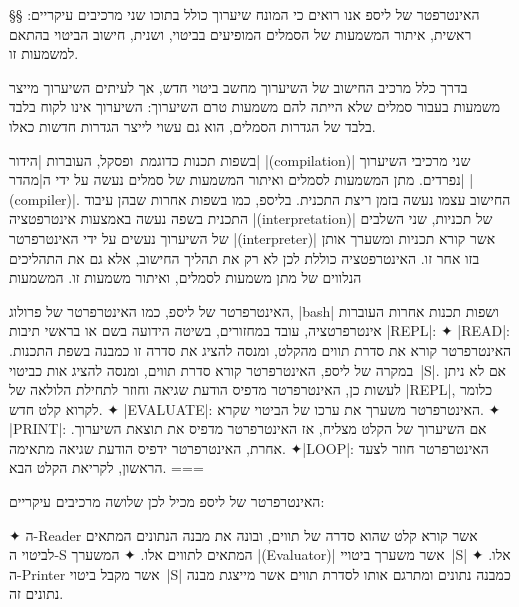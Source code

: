 §§ האינטרפטר של ליספ
אנו רואים כי המונח שיערוך כולל בתוכו שני מרכיבים עיקריים: ראשית, איתור המשמעות
של הסמלים המופיעים בביטוי, ושנית, חישוב הביטוי בהתאם למשמעות זו.

בדרך כלל מרכיב החישוב של השיערוך מחשב ביטוי חדש, אך לעיתים השיערוך מייצר משמעות
בעבור סמלים שלא הייתה להם משמעות טרם השיערוך: השיערוך אינו לקוח בלבד
בלבד של הגדרות הסמלים, הוא גם עשוי לייצר הגדרות חדשות כאלו.

בשפות תכנות כדוגמת~\CPL ופסקל, העוברות \ע|הידור| \E|(compilation)| שני מרכיבי
השיערוך נפרדים. מתן המשמעות לסמלים ואיתור המשמעות של סמלים נעשה על ידי
ה\ע|מהדר| \E|(compiler)|. החישוב עצמו נעשה בזמן ריצת התכנית. בליספ, כמו בשפות
אחרות שבהן עיבוד התכנית בשפה נעשה באמצעות אינטרפטציה \E|(interpretation)| של
תכניות, שני השלבים של השיערוך נעשים על ידי האינטרפרטר \E|(interpreter)| אשר
קורא תכניות ומשערך אותן בזו אחר זו. האינטרפטציה כוללת לכן לא רק את תהליך החישוב,
אלא גם את התהליכים הנלווים של מתן משמעות לסמלים, ואיתור משמעות זו.
המשמעות

\begin{minipage}\linewidth
  \footnotesize
  \begin{mdframed}[backgroundcolor=Lavender!20]
    האינטרפרטר של ליספ, כמו האינטרפרטר של פרולוג, \E|bash| ושפות תכנות אחרות
    העוברות אינטרפרטציה, עובד במחזורים, בשיטה הידועה בשם
    או בראשי תיבות \E|REPL|:
    ✦ \E|READ|: האינטרפרטר קורא את סדרת תווים מהקלט, ומנסה להציג את סדרה זו
    כמבנה בשפת התכנות. במקרה של ליספ, האינטרפרטר קורא סדרת תווים, ומנסה להציג
    אות כביטוי~\E|S|. אם לא ניתן לעשות כן, האינטרפרטר מדפיס הודעת שגיאה וחוזר
    לתחילת הלולאה של \E|REPL|, כלומר לקרוא קלט חדש.
    ✦ \E|EVALUATE|: האינטרפרטר משערך את ערכו של הביטוי שקרא.
    ✦ \E|PRINT|: אם השיערוך של הקלט מצליח, אז האינטרפרטר מדפיס את תוצאת
    השיערוך. אחרת, האינטרפרטר ידפיס הודעת שגיאה מתאימה.
    ✦\E|LOOP|: האינטרפרטר חוזר לצעד הראשון, לקריאת הקלט הבא.
===
  \end{mdframed}
\end{minipage}

האינטרפרטר של ליספ מכיל לכן שלושה מרכיבים עיקריים:
\begin{enumerate}
  ✦ ה-Reader אשר קורא קלט שהוא סדרה של תווים, ובונה את מבנה הנתונים המתאים
  לביטוי ה-S המתאים לתווים אלו.
  ✦ המשערך \E|(Evaluator)| אשר משערך ביטויי~\E|S| אלו.
  ✦ ה-Printer אשר מקבל ביטוי~\E|S| כמבנה נתונים ומתרגם אותו לסדרת תווים אשר
  מייצגת מבנה נתונים זה.
\end{enumerate}

